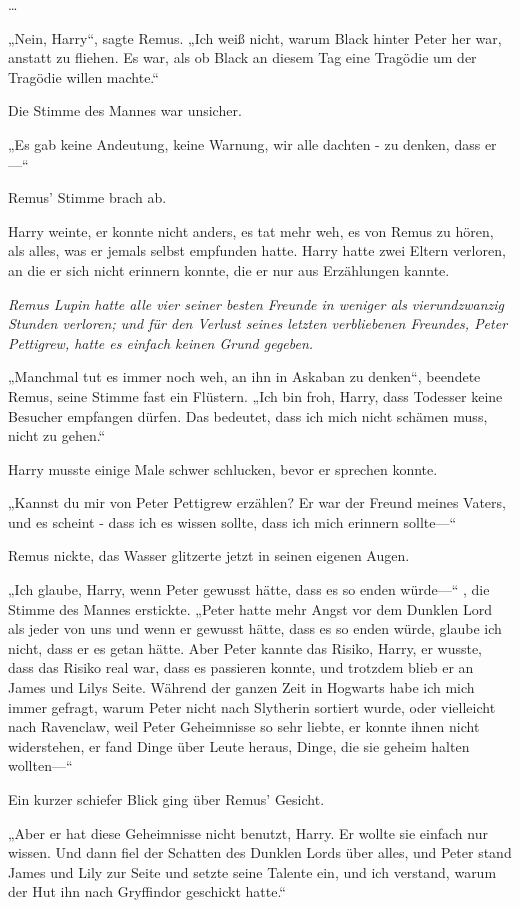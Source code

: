 {…

„Nein, Harry“, sagte Remus. „Ich weiß nicht, warum Black hinter Peter her war, anstatt zu fliehen. Es war, als ob Black an diesem Tag eine Tragödie um der Tragödie willen machte.“

Die Stimme des Mannes war unsicher.

„Es gab keine Andeutung, keine Warnung, wir alle dachten - zu denken, dass er—“

Remus' Stimme brach ab.

Harry weinte, er konnte nicht anders, es tat mehr weh, es von Remus zu hören, als alles, was er jemals selbst empfunden hatte. Harry hatte zwei Eltern verloren, an die er sich nicht erinnern konnte, die er nur aus Erzählungen kannte.

\emph{Remus Lupin hatte alle vier seiner besten Freunde in weniger als vierundzwanzig Stunden verloren; und für den Verlust seines letzten verbliebenen Freundes, Peter Pettigrew, hatte es einfach keinen Grund gegeben.}

„Manchmal tut es immer noch weh, an ihn in Askaban zu denken“, beendete Remus, seine Stimme fast ein Flüstern. „Ich bin froh, Harry, dass Todesser keine Besucher empfangen dürfen. Das bedeutet, dass ich mich nicht schämen muss, nicht zu gehen.“

Harry musste einige Male schwer schlucken, bevor er sprechen konnte.

„Kannst du mir von Peter Pettigrew erzählen? Er war der Freund meines Vaters, und es scheint - dass ich es wissen sollte, dass ich mich erinnern sollte—“

Remus nickte, das Wasser glitzerte jetzt in seinen eigenen Augen.

„Ich glaube, Harry, wenn Peter gewusst hätte, dass es so enden würde—“ , die Stimme des Mannes erstickte. „Peter hatte mehr Angst vor dem Dunklen Lord als jeder von uns und wenn er gewusst hätte, dass es so enden würde, glaube ich nicht, dass er es getan hätte. Aber Peter kannte das Risiko, Harry, er wusste, dass das Risiko real war, dass es passieren konnte, und trotzdem blieb er an James und Lilys Seite. Während der ganzen Zeit in Hogwarts habe ich mich immer gefragt, warum Peter nicht nach Slytherin sortiert wurde, oder vielleicht nach Ravenclaw, weil Peter Geheimnisse so sehr liebte, er konnte ihnen nicht widerstehen, er fand Dinge über Leute heraus, Dinge, die sie geheim halten wollten—“

Ein kurzer schiefer Blick ging über Remus' Gesicht.

„Aber er hat diese Geheimnisse nicht benutzt, Harry. Er wollte sie einfach nur wissen. Und dann fiel der Schatten des Dunklen Lords über alles, und Peter stand James und Lily zur Seite und setzte seine Talente ein, und ich verstand, warum der Hut ihn nach Gryffindor geschickt hatte.“

}
